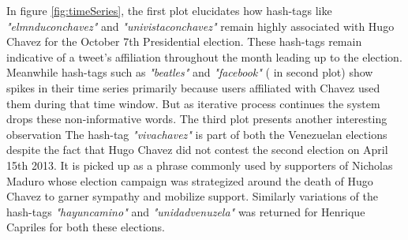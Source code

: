 In figure \ref{fig:timeSeries}, the first plot elucidates how hash-tags like \emph{"elmnduconchavez"} and \emph{"univistaconchavez"} remain highly associated with Hugo Chavez for the October 7th Presidential election. 
These hash-tags remain indicative of a tweet's affiliation throughout the month leading up to the election.
Meanwhile hash-tags such as \emph{"beatles"} and \emph{"facebook"} ( in second plot) show spikes in their time series primarily because users affiliated with Chavez used them during that time window. 
But as iterative process continues the system drops these non-informative words.
The third plot presents another interesting observation 
The hash-tag \emph{"vivachavez"} is part of both the Venezuelan elections despite the fact that Hugo Chavez did not contest the second election on April 15th 2013. 
It is picked up as a phrase commonly used by supporters of Nicholas Maduro whose election campaign was strategized around the death of Hugo Chavez to garner sympathy and mobilize support.
Similarly variations of the hash-tags \emph{"hayuncamino"} and \emph{"unidadvenuzela"} was returned for Henrique Capriles for both these elections.
